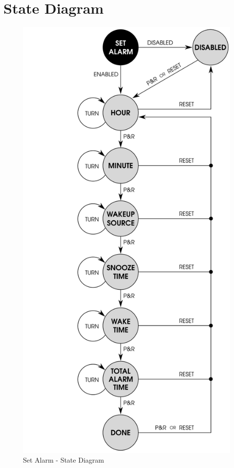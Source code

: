 \section{State Diagram} \label{Set Alarm State Diagram}

\begin{figure}[H]
  \centering
  \includegraphics{images/set_alarm_state_diagram.png}
  \caption{Set Alarm - State Diagram}
\end{figure}

